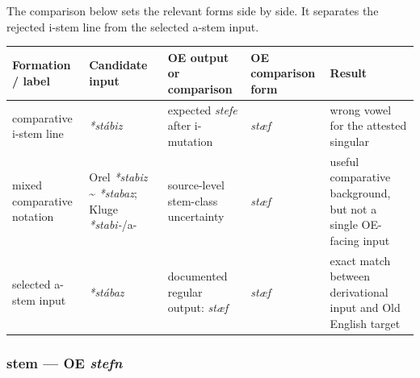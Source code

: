 \documentclass[
  british,
  a4paper,
]{article}
\newcounter{none} %
\begin{document}
The comparison below sets the relevant forms side by side. It separates
the rejected i-stem line from the selected a-stem input.

{\def\LTcaptype{none} %
\begin{longtable}[]{@{}
  >{\raggedright\arraybackslash}p{}
  >{\raggedright\arraybackslash}p{}
  >{\raggedright\arraybackslash}p{}
  >{\raggedright\arraybackslash}p{}
  >{\raggedright\arraybackslash}p{}@{}}
\toprule\noalign{}
\begin{minipage}[b]{\linewidth}\raggedright
Formation / label
\end{minipage} & \begin{minipage}[b]{\linewidth}\raggedright
Candidate input
\end{minipage} & \begin{minipage}[b]{\linewidth}\raggedright
OE output or comparison
\end{minipage} & \begin{minipage}[b]{\linewidth}\raggedright
OE comparison form
\end{minipage} & \begin{minipage}[b]{\linewidth}\raggedright
Result
\end{minipage} \\
\midrule\noalign{}
\endhead
\bottomrule\noalign{}
\endlastfoot
comparative i-stem line & {\emph{*stábiz}} & expected {\emph{stefe}}
after i-mutation & {\emph{stæf}} & wrong vowel for the attested
singular \\
mixed comparative notation & Orel \emph{*stabiz} \textasciitilde{}
\emph{*stabaz}; Kluge \emph{*stabi-}/a- & source-level stem-class
uncertainty & \emph{stæf} & useful comparative background, but not a
single OE-facing input \\
selected a-stem input & {\emph{*stábaz}} & documented regular output:
{\emph{stæf}} & {\emph{stæf}} & exact match between derivational input
and Old English target \\
\end{longtable}
}

\subsubsection{\texorpdfstring{stem --- OE
\emph{stefn}}{stem --- OE stefn}}\label{stem-oe-stefn}
\end{document}
